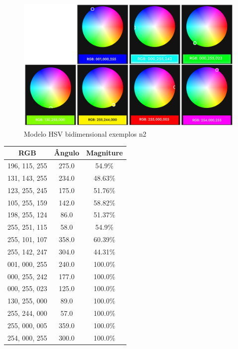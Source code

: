 \begin{figure}[htb]
	\centering
	\includegraphics[width=1.0\textwidth]{figures/example_2_arduino_color}
	\caption{Modelo HSV bidimensional exemplos n2}
	\label{hsv_exemplo_2}
\end{figure}

\begin{quadro}[htb]
	\caption{\label{HSV_resultado}Resultado algoritmo}
		 \begin{tabular}{|c|c|c|}
			\hline
			\textbf{RGB} & \textbf{Ângulo} & \textbf{Magniture} \\ \hline
			196, 115, 255 & 275.0 & 54.9\% \\ \hline
			131, 143, 255 & 234.0 & 48.63\% \\ \hline
			123, 255, 245 & 175.0 & 51.76\% \\ \hline
			105, 255, 159 & 142.0 & 58.82\% \\ \hline
			198, 255, 124 & 86.0 & 51.37\% \\ \hline
			255, 251, 115 & 58.0 & 54.9\% \\ \hline
			255, 101, 107 & 358.0 & 60.39\% \\ \hline
			255, 142, 247 & 304.0 & 44.31\% \\ \hline
			001, 000, 255 & 240.0 & 100.0\% \\ \hline
			000, 255, 242 & 177.0 & 100.0\% \\ \hline
			000, 255, 023 & 125.0 & 100.0\% \\ \hline
			130, 255, 000 & 89.0 & 100.0\% \\ \hline
			255, 244, 000 & 57.0 & 100.0\% \\ \hline
			255, 000, 005 & 359.0 & 100.0\% \\ \hline
			254, 000, 255 & 300.0 & 100.0\% \\ \hline
		\end{tabular}
	\end{quadro}
